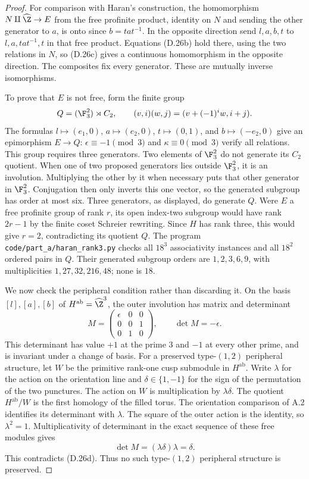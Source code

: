\begin{proof}
For comparison with Haran's construction, the homomorphism
$N\amalg\widehat\Z\to E$ from the free profinite product,
identity on $N$ and sending the other generator to $a$,
is onto since $b=tat^{-1}$. In the opposite direction send
$l,a,b,t$ to $l,a,tat^{-1},t$ in that free product.
Equations (D.26b) hold there, using the two relations in
$N$, so (D.26c) gives a continuous homomorphism in the
opposite direction. The composites fix every generator.
These are mutually inverse isomorphisms.

To prove that $E$ is not free, form the finite group
\[
 Q=(\F_3^2)\rtimes C_2,
 \qquad (v,i)(w,j)=(v+(-1)^iw,i+j).
\]
The formulas $l\mapsto(e_1,0)$, $a\mapsto(e_2,0)$,
$t\mapsto(0,1)$, and $b\mapsto(-e_2,0)$ give an
epimorphism $E\to Q$: $\epsilon\equiv-1\pmod3$ and
$\kappa\equiv0\pmod3$ verify all relations.
This group requires three generators. Two elements of
$\F_3^2$ do not generate its $C_2$ quotient. When one
of two proposed generators lies outside $\F_3^2$, it is
an involution. Multiplying the other by it when necessary
puts that other generator in $\F_3^2$. Conjugation then
only inverts this one vector, so the generated subgroup
has order at most six. Three generators, as displayed,
do generate $Q$.
Were $E$ a free profinite group of rank $r$, its open
index-two subgroup would have rank $2r-1$ by the finite
coset Schreier rewriting. Since $H$ has rank three,
this would give $r=2$, contradicting its quotient $Q$.
The program \texttt{code/part\_a/haran\_rank3.py}
checks all $18^3$ associativity instances and all $18^2$
ordered pairs in $Q$. Their generated subgroup orders
are $1,2,3,6,9$, with multiplicities $1,27,32,216,48$;
none is $18$.

We now check the peripheral condition rather than
discarding it. On the basis $[l],[a],[b]$ of
$H^{\mathrm{ab}}=\widehat\Z^3$, the outer involution has
matrix and determinant
\[
 M=\begin{pmatrix}\epsilon&0&0\\0&0&1\\0&1&0\end{pmatrix},
 \qquad\det M=-\epsilon.
                                                               \tag{D.26d}
\]
This determinant has value $+1$ at the prime $3$ and
$-1$ at every other prime, and is invariant under a
change of basis. For a preserved type-$(1,2)$ peripheral
structure, let $W$ be the primitive rank-one cusp
submodule in $H^{\mathrm{ab}}$. Write $\lambda$ for the
action on the orientation line and $\delta\in\{1,-1\}$
for the sign of the permutation of the two punctures.
The action on $W$ is multiplication by $\lambda\delta$.
The quotient $H^{\mathrm{ab}}/W$ is the first homology
of the filled torus. The orientation comparison of A.2
identifies its determinant with $\lambda$.
The square of the outer action is the identity, so
$\lambda^2=1$. Multiplicativity of determinant in the
exact sequence of these free modules gives
\[
 \det M=(\lambda\delta)\lambda=\delta.
\]
This contradicts (D.26d). Thus no such type-$(1,2)$
peripheral structure is preserved.


\end{proof}
